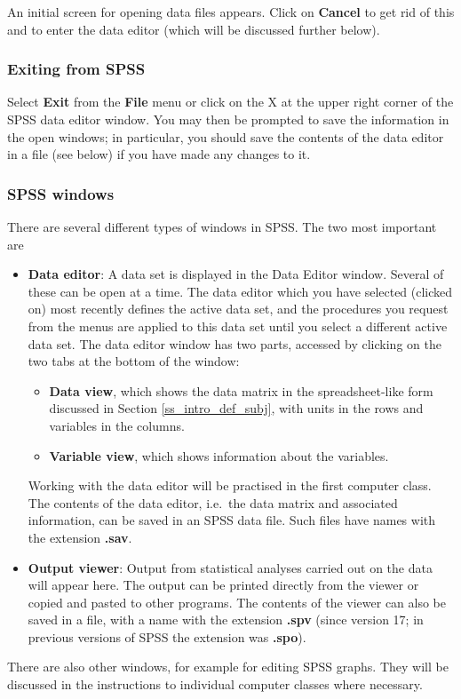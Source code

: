 An initial screen for opening data files appears. Click on
\textbf{Cancel} to get rid of this and to enter the data editor (which
will be discussed further below).


\subsubsection{Exiting from SPSS}

Select \textbf{Exit} from the \textbf{File} menu or click on the X at
the upper right corner of the SPSS data editor window. You may then be
prompted to save the information in the open windows; in particular, you
should save the contents of the data editor in a file (see below) if you
have made any changes to it.

\subsubsection{SPSS windows}

There are several different types of windows in SPSS. The two most
important are
\begin{itemize}
\item
\textbf{Data editor}: A data set is displayed in the Data Editor window.
Several of these can be open at a time.
The data editor which you have selected (clicked on) most recently defines the active data set,
and the procedures you request from the menus are applied to this data
set until you select a different active data set.
The data editor window has two parts,
accessed by clicking on the two tabs at the bottom of the window:
\begin{itemize}
\item
\textbf{Data view}, which shows the data matrix in the spreadsheet-like form discussed in
Section \ref{ss_intro_def_subj}, with units in the rows and variables in
the columns.
\item
\textbf{Variable view}, which shows information about the variables.
\end{itemize}
Working with the data editor will be practised in the first computer
class. The contents of the data editor, i.e.\
the data matrix and associated information, can be saved in an SPSS data
file. Such files have names with the extension \textbf{.sav}.
\item
\textbf{Output viewer}: Output from statistical analyses carried out on
the data will appear here. The output can be printed directly from the
viewer or copied and pasted to other programs. The contents of the
viewer can also be saved in a file, with a name with the extension
\textbf{.spv} (since version 17; in previous versions
of SPSS the extension was
\textbf{.spo}).
\end{itemize}
There are also other windows, for example for editing SPSS graphs. They
will be discussed in the instructions to individual computer classes
where necessary.

